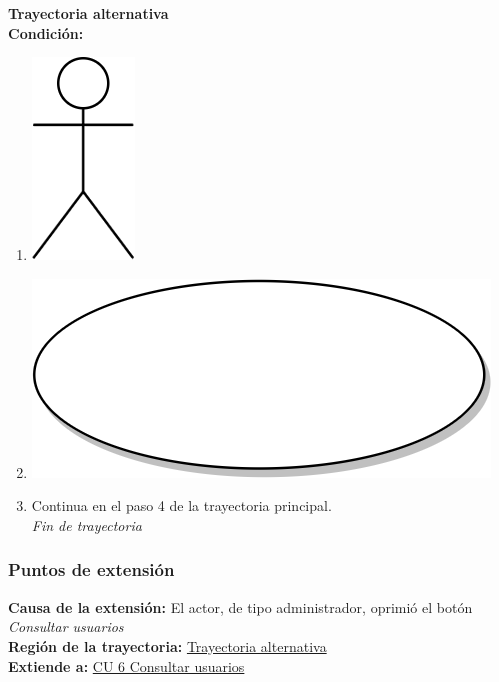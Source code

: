 \textbf{Trayectoria alternativa} \label{cu_ta_} \\
\textbf{Condición:} \\
 \begin{enumerate}[label=\arabic*]
    \item {\includegraphics[scale=.1]{Capitulo3/img/actor.png} }
    \item {\includegraphics[scale=.05]{Capitulo3/img/proceso.png}}
    \item {Continua en el paso 4 de la trayectoria principal.} \\
    \textit{Fin de trayectoria} \\
\end{enumerate}


\subsubsection{Puntos de extensión}
\noindent \textbf{Causa de la extensión:} El actor, de tipo administrador, oprimió el botón \textit{Consultar usuarios} \\
\textbf{Región de la trayectoria:} \hyperref[cu_ta_]{Trayectoria alternativa } \\
\textbf{Extiende a:} \hyperref[cu6]{CU 6 Consultar usuarios}
